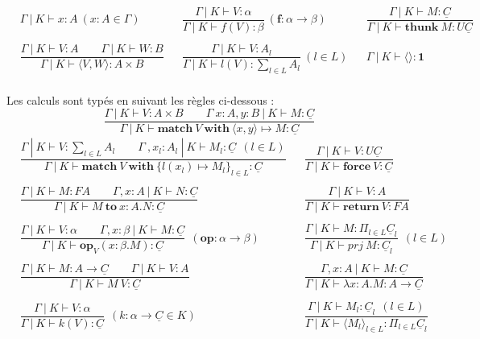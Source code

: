 	\begin{align*}
		&\Gamma~|~K \vdash x:A~(x:A \in \Gamma) & &\dfrac{\Gamma~|~K \vdash V:\alpha}{\Gamma~|~K \vdash f(V):\beta}~(\textbf{f}:\alpha \rightarrow \beta) & &\dfrac{\Gamma~|~K \vdash M:\underline{C}}{\Gamma~|~K \vdash \textbf{thunk}~M:U\underline{C}}\\\\
		&\dfrac{\Gamma~|~K \vdash V:A\quad\quad\Gamma~|~K \vdash W:B}{\Gamma~|~K \vdash \langle V,W \rangle:A \times B} & &\dfrac{\Gamma~|~K \vdash V:A_l}{\Gamma~|~K \vdash l(V):\sum_{l \in L}A_l}~(l \in L) & &\Gamma~|~K \vdash \langle\rangle:\textbf{1}
	\end{align*}
	\\
	Les calculs sont typés en suivant les règles ci-dessous :
	\[\dfrac{\Gamma~|~K \vdash V : A \times B\quad\quad\Gamma~x:A,y:B~|~K \vdash M:\underline{C}}{\Gamma~|~K \vdash \textbf{match}~V~\textbf{with}~\langle x,y\rangle  \mapsto M:\underline{C}}\]
	\begin{align*}	
		&\dfrac{\Gamma~|~K \vdash V : \sum_{l \in L}A_l\quad\quad\Gamma~,x_l:A_l~|~K \vdash M_l:\underline{C}~~(l\in L)}{\Gamma~|~K \vdash \textbf{match}~V~\textbf{with}~\{ l(x_l) \mapsto M_l\}_{l \in L}:\underline{C}} &
		&\dfrac{\Gamma~|~K \vdash V : U\underline{C}}{\Gamma~|~K \vdash \textbf{force}~V:\underline{C}}\\\\
		&\dfrac{\Gamma~|~K \vdash M:FA\quad\quad\Gamma,x:A~|~K \vdash N:\underline{C}}{\Gamma~|~K \vdash M~\textbf{to}~x:A.N:\underline{C}} &
		&\dfrac{\Gamma~|~K \vdash V : A}{\Gamma~|~K \vdash \textbf{return}~V:FA}\\\\
		&\dfrac{\Gamma~|~K \vdash V:\alpha\quad\quad\Gamma,x:\beta~|~K \vdash M : \underline{C}}{\Gamma~|~K \vdash \textbf{op}_V(x:\beta.M):\underline{C}}~~(\textbf{op}:\alpha \rightarrow \beta) &
		&\dfrac{\Gamma~|~K \vdash M : \Pi_{l\in L} \underline{C}_l}{\Gamma~|~K \vdash prj~M:\underline{C}_l}~~(l \in L) \\\\
		&\dfrac{\Gamma~|~K \vdash M : A \rightarrow \underline{C}\quad\quad\Gamma~|~K \vdash V:A }{\Gamma~|~K \vdash M~V:\underline{C}  } &
		&\dfrac{\Gamma,x:A~|~K \vdash M : \underline{C}}{\Gamma~|~K \vdash \lambda x:A.M:A \rightarrow \underline{C}} \\\\
		&\dfrac{\Gamma~|~K \vdash V:\alpha}{\Gamma~|~K \vdash k(V):\underline{C}}~~(k:\alpha \rightarrow \underline{C} \in K) &
		&\dfrac{\Gamma~|~K \vdash M_l:\underline{C}_l~~(l \in L)}{\Gamma~|~K \vdash \langle M_l\rangle_{l \in L}:\Pi_{l\in L}\underline{C}_l}\\
	\end{align*}
